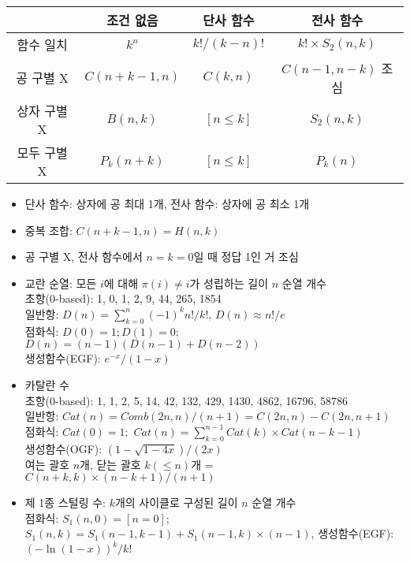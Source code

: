 \begin{tabular}{|c|c|c|c|} \hline
    & 조건 없음 & 단사 함수 & 전사 함수 \\ \hline
    함수 일치 & $k^n$ & $k! / (k-n)!$ & $k! \times S_2(n, k)$ \\ \hline
    공 구별 X & $C(n+k-1, n)$ & $C(k, n)$ & $C(n-1, n-k)$ 조심 \\ \hline
    상자 구별 X & $B(n, k)$ & $[n \leq k]$ & $S_2(n, k)$ \\ \hline
    모두 구별 X & $P_k(n+k)$ & $[n \leq k]$ & $P_k(n)$ \\ \hline
\end{tabular}

\begin{itemize}[noitemsep]
    \item 단사 함수: 상자에 공 최대 1개, 전사 함수: 상자에 공 최소 1개
    \item 중복 조합: $C(n+k-1, n) = H(n, k)$
    \item 공 구별 X, 전사 함수에서 $n=k=0$일 때 정답 1인 거 조심
    \item 교란 순열: 모든 $i$에 대해 $\pi(i) \ne i$가 성립하는 길이 $n$ 순열 개수\\
    초항(0-based): 1, 0, 1, 2, 9, 44, 265, 1854\\
    일반항: $D(n) = \sum_{k=0}^{n} (-1)^kn!/k!$, $D(n) \approx n!/e$\\
    점화식: $D(0)=1; D(1)=0;$ $D(n) = (n-1)(D(n-1)+D(n-2))$\\
    생성함수(EGF): $e^{-x}/(1-x)$
    \item 카탈란 수\\
    초항(0-based): 1, 1, 2, 5, 14, 42, 132, 429, 1430, 4862, 16796, 58786\\
    일반항: $Cat(n) = Comb(2n, n) / (n+1) = C(2n, n) - C(2n, n+1)$\\
    점화식: $Cat(0) = 1;$ $Cat(n) = \sum_{k=0}^{n-1} Cat(k) \times Cat(n-k-1)$\\
    생성함수(OGF): $(1-\sqrt{1-4x})/(2x)$\\
    여는 괄호 $n$개, 닫는 괄호 $k(\leq n)$개 = $C(n+k, k) \times (n-k+1) / (n+1)$
    \item 제 1종 스털링 수: $k$개의 사이클로 구성된 길이 $n$ 순열 개수\\
    점화식: $S_1(n,0)=[n=0];$ $S_1(n,k)=S_1(n-1,k-1) + S_1(n-1,k) \times (n-1)$, 생성함수(EGF): $(-\ln(1-x))^k / k!$\\

\end{itemize}
